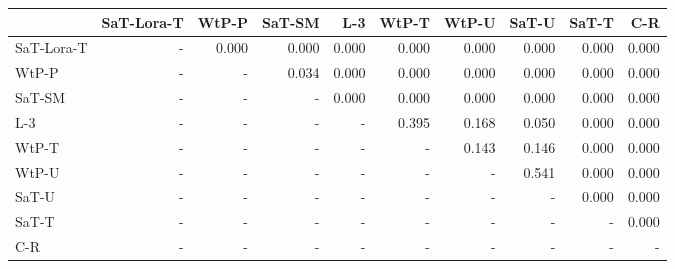 \begin{tabular}{lrrrrrrrrr}
\toprule
 & SaT-Lora-T & WtP-P & SaT-SM & L-3 & WtP-T & WtP-U & SaT-U & SaT-T & C-R \\
\midrule
SaT-Lora-T & - & 0.000 & 0.000 & 0.000 & 0.000 & 0.000 & 0.000 & 0.000 & 0.000 \\
WtP-P & - & - & 0.034 & 0.000 & 0.000 & 0.000 & 0.000 & 0.000 & 0.000 \\
SaT-SM & - & - & - & 0.000 & 0.000 & 0.000 & 0.000 & 0.000 & 0.000 \\
L-3 & - & - & - & - & 0.395 & 0.168 & 0.050 & 0.000 & 0.000 \\
WtP-T & - & - & - & - & - & 0.143 & 0.146 & 0.000 & 0.000 \\
WtP-U & - & - & - & - & - & - & 0.541 & 0.000 & 0.000 \\
SaT-U & - & - & - & - & - & - & - & 0.000 & 0.000 \\
SaT-T & - & - & - & - & - & - & - & - & 0.000 \\
C-R & - & - & - & - & - & - & - & - & - \\
\bottomrule
\end{tabular}

